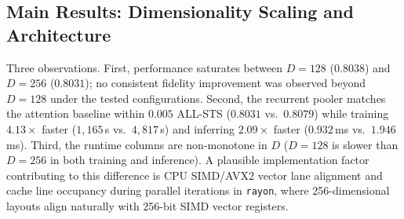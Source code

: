 \documentclass[10pt,journal,compsoc]{IEEEtran}
\begin{document}
\subsection{Main Results: Dimensionality Scaling and Architecture}
\begin{table}[t!]
\caption{Dimensionality scaling and architectural comparison. Per-dataset rows: zero-shot Human-Gold Pearson ($r$). ALL-STS row: Teacher-Fidelity Pearson ($r$) over $29{,}720$ pooled pairs. Best student value per row in bold where applicable.}
\label{tab:main_results}
\begin{center}
\end{center}
\end{table}

Three observations. First, performance saturates between $D{=}128$ ($0.8038$) and $D{=}256$ ($0.8031$); no consistent fidelity improvement was observed beyond $D{=}128$ under the tested configurations. Second, the recurrent pooler matches the attention baseline within $0.005$ ALL-STS ($0.8031$ vs.\ $0.8079$) while training $4.13\times$ faster ($1{,}165$\,s vs.\ $4{,}817$\,s) and inferring $2.09\times$ faster ($0.932$\,ms vs.\ $1.946$\,ms). Third, the runtime columns are non-monotone in $D$ ($D{=}128$ is slower than $D{=}256$ in both training and inference). A plausible implementation factor contributing to this difference is CPU SIMD/AVX2 vector lane alignment and cache line occupancy during parallel iterations in \texttt{rayon}, where 256-dimensional layouts align naturally with 256-bit SIMD vector registers.
\end{document}
